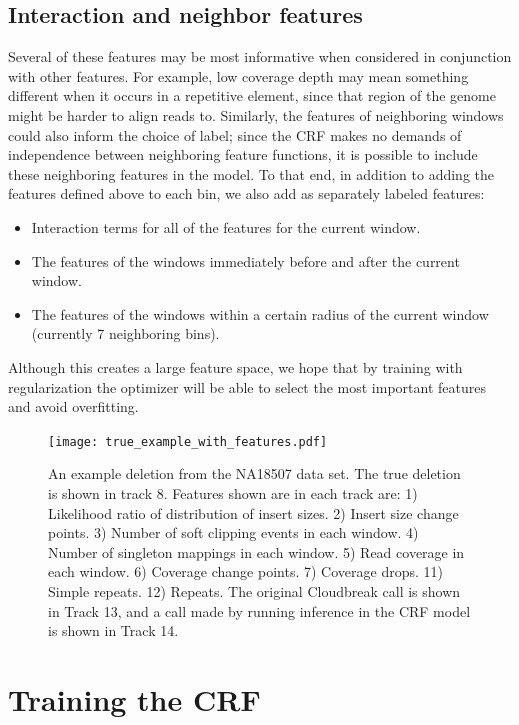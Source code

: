 \subsection{Interaction and neighbor features}

Several of these features may be most informative when considered in conjunction with other features. For example, low coverage depth may mean something different when it occurs in a repetitive element, since that region of the genome might be harder to align reads to. Similarly, the features of neighboring windows could also inform the choice of label; since the CRF makes no demands of independence between neighboring feature functions, it is possible to include these neighboring features in the model. To that end, in addition to adding the features defined above to each bin, we also add as separately labeled features:

\begin{itemize}
\item Interaction terms for all of the features for the current window. 
\item The features of the windows immediately before and after the current window.
\item The features of the windows within a certain radius of the current window (currently 7 neighboring bins).
\end{itemize}

Although this creates a large feature space, we hope that by training with regularization the optimizer will be able to select the most important features and avoid overfitting.

\begin{figure}
\centering
\texttt{[image: true\_example\_with\_features.pdf]}
\caption{An example deletion from the NA18507 data set. The true deletion is shown in track 8. Features shown are in each track are: 1) Likelihood ratio of distribution of insert sizes. 2) Insert size change points. 3) Number of soft clipping events in each window. 4) Number of singleton mappings in each window. 5) Read coverage in each window. 6) Coverage change points. 7) Coverage drops. 11) Simple repeats. 12) Repeats. The original Cloudbreak call is shown in Track 13, and a call made by running inference in the CRF model is shown in Track 14.}
\label{crf_features_example}
\end{figure}

\section{Training the CRF}

